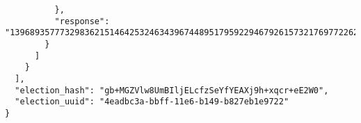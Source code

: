 \begin{lstlisting}
          },
          "response": "13968935777329836215146425324634396744895179592294679261573217697722622897973"
        }
      ]
    }
  ],
  "election_hash": "gb+MGZVlw8UmBIljELcfzSeYfYEAXj9h+xqcr+eE2W0",
  "election_uuid": "4eadbc3a-bbff-11e6-b149-b827eb1e9722"
}

\end{lstlisting}
